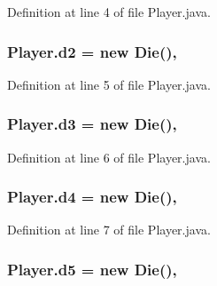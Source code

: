 Definition at line 4 of file Player.\-java.

\hypertarget{class_player_a1c73264f71cfaa2e0530fb0f3bfd4e1e}{
\subsubsection[{d2}]{ Player.\-d2 = new {\bf Die}()\hspace{0.3cm}{\ttfamily [package]}, {\ttfamily [inherited]}}}\label{class_player_a1c73264f71cfaa2e0530fb0f3bfd4e1e}


Definition at line 5 of file Player.\-java.

\hypertarget{class_player_a541f8c109e7478eba805cb1638007cad}{
\subsubsection[{d3}]{ Player.\-d3 = new {\bf Die}()\hspace{0.3cm}{\ttfamily [package]}, {\ttfamily [inherited]}}}\label{class_player_a541f8c109e7478eba805cb1638007cad}


Definition at line 6 of file Player.\-java.

\hypertarget{class_player_afe8794243ec655d08fcf9df5691d7fe6}{
\subsubsection[{d4}]{ Player.\-d4 = new {\bf Die}()\hspace{0.3cm}{\ttfamily [package]}, {\ttfamily [inherited]}}}\label{class_player_afe8794243ec655d08fcf9df5691d7fe6}


Definition at line 7 of file Player.\-java.

\hypertarget{class_player_ae09435fbfcb1f6dc0d6e4e30ce5e7d03}{
\subsubsection[{d5}]{ Player.\-d5 = new {\bf Die}()\hspace{0.3cm}{\ttfamily [package]}, {\ttfamily [inherited]}}}\label{class_player_ae09435fbfcb1f6dc0d6e4e30ce5e7d03}


